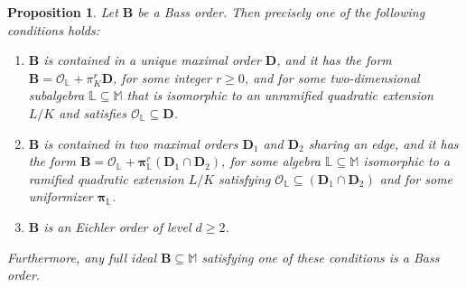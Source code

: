\documentclass{amsart}
\newtheorem{proposition}[theorem]{Proposition}
\theoremstyle{definition}
\newcommand\lu{\mathbb{L}}
\newcommand\alge{\mathbb{M}}
\newcommand\Ba{\mathbf B}
\newcommand\Da{\mathbf{D}}
\begin{document}
\begin{proposition}\label{p41n}
Let $\Ba$ be a Bass order. Then precisely one of the following
conditions holds:
\begin{enumerate}[label=($\mathfrak{E}$\bf{\arabic*})]
    \item\label{Ea1} $\Ba$ is contained in a unique maximal 
    order $\Da$, and it has the form 
    $\Ba=\mathcal{O}_{\lu}+\pi_K^r\Da$,
    for some integer $r\geq0$, and for some two-dimensional 
    subalgebra $\lu\subseteq\alge$ that is
    isomorphic to an unramified quadratic extension $L/K$
    and satisfies $\mathcal{O}_{\lu}\subseteq\Da$.
    \item\label{Ea2} $\Ba$ is contained in two maximal orders 
    $\Da_1$ and $\Da_2$ sharing an edge, and it has the form 
    $\Ba=\mathcal{O}_{\lu}+
    \boldsymbol\pi_{\lu}^r(\Da_1\cap\Da_2)$, 
    for some algebra $\lu\subseteq\alge$ isomorphic 
    to a ramified quadratic extension $L/K$ satisfying
    $\mathcal{O}_{\lu}\subseteq(\Da_1\cap\Da_2)$
    and for some 
    uniformizer $\boldsymbol\pi_{\lu}$.
    \item \label{Ea3} $\Ba$ is an Eichler order 
    of level $d\geq 2$.
\end{enumerate} 
Furthermore, any full ideal $\Ba\subseteq\alge$ satisfying one
of these conditions is a Bass order.
\end{proposition}
\end{document}
